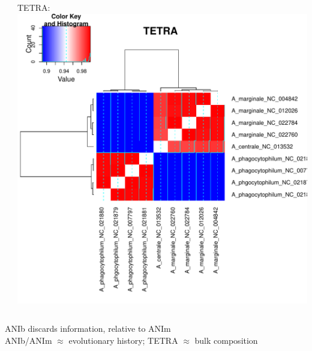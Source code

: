 \begin{frame}
\begin{columns}[T]
\begin{column}{4cm}
    \end{column}
    \begin{column}{4cm}   
    TETRA:\\
      \includegraphics[width=1\textwidth]{images/TETRA}
    \end{column}
  \end{columns}       
  ANIb discards information, relative to ANIm\\
  ANIb/ANIm $\approx$ evolutionary history; TETRA $\approx$ bulk composition
\end{frame}

